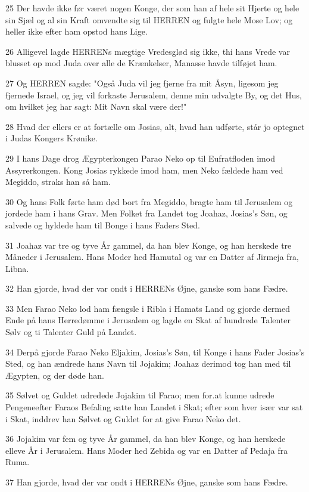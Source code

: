 \par 25 Der havde ikke før været nogen Konge, der som han af hele sit Hjerte og hele sin Sjæl og al sin Kraft omvendte sig til HERREN og fulgte hele Mose Lov; og heller ikke efter ham opstod hans Lige.
\par 26 Alligevel lagde HERRENs mægtige Vredesglød sig ikke, thi hans Vrede var blusset op mod Juda over alle de Krænkelser, Manasse havde tilføjet ham.
\par 27 Og HERREN sagde: "Også Juda vil jeg fjerne fra mit Åsyn, ligesom jeg fjernede Israel, og jeg vil forkaste Jerusalem, denne min udvalgte By, og det Hus, om hvilket jeg har sagt: Mit Navn skal være der!"
\par 28 Hvad der ellers er at fortælle om Josias, alt, hvad han udførte, står jo optegnet i Judas Kongers Krønike.
\par 29 I hans Dage drog Ægypterkongen Parao Neko op til Eufratfloden imod Assyrerkongen. Kong Josias rykkede imod ham, men Neko fældede ham ved Megiddo, straks han så ham.
\par 30 Og hans Folk førte ham død bort fra Megiddo, bragte ham til Jerusalem og jordede ham i hans Grav. Men Folket fra Landet tog Joahaz, Josias's Søn, og salvede og hyldede ham til Bonge i hans Faders Sted.
\par 31 Joahaz var tre og tyve År gammel, da han blev Konge, og han herskede tre Måneder i Jerusalem. Hans Moder hed Hamutal og var en Datter af Jirmeja fra, Libna.
\par 32 Han gjorde, hvad der var ondt i HERRENs Øjne, ganske som hans Fædre.
\par 33 Men Farao Neko lod ham fængsle i Ribla i Hamats Land og gjorde dermed Ende på hans Herredømme i Jerusalem og lagde en Skat af hundrede Talenter Sølv og ti Talenter Guld på Landet.
\par 34 Derpå gjorde Farao Neko Eljakim, Josias's Søn, til Konge i hans Fader Josias's Sted, og han ændrede hans Navn til Jojakim; Joahaz derimod tog han med til Ægypten, og der døde han.
\par 35 Sølvet og Guldet udredede Jojakim til Farao; men for.at kunne udrede Pengeneefter Faraos Befaling satte han Landet i Skat; efter som hver især var sat i Skat, inddrev han Sølvet og Guldet for at give Farao Neko det.
\par 36 Jojakim var fem og tyve År gammel, da han blev Konge, og han herskede elleve År i Jerusalem. Hans Moder hed Zebida og var en Datter af Pedaja fra Ruma.
\par 37 Han gjorde, hvad der var ondt i HERRENs Øjne, ganske som hans Fædre.

